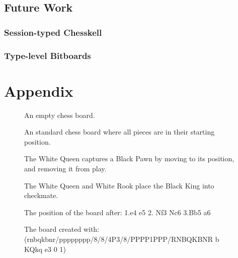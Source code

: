 \documentclass[12pt, a4paper, bibliography=totocnumbered]{scrreprt}
\begin{document}
\section{Future Work}

\subsection{Session-typed Chesskell}

\subsection{Type-level Bitboards}






\chapter{Appendix}

\begin{figure}
    \showboard
    \caption{An empty chess board.}
    \label{chessboard}
\end{figure}

\begin{figure}
    \newgame
    \showboard
    \caption{An standard chess board where all pieces are in their starting position.}
    \label{startboard}
\end{figure}

\begin{figure}
    \showboard
    \quad
    \showboard
    \caption{The White Queen captures a Black Pawn by moving to its position, and removing it from play.}
    \label{capture}
\end{figure}

\begin{figure}
    \showboard
    \caption{The White Queen and White Rook place the Black King into checkmate.}
    \label{checkmate}
\end{figure}

\begin{figure}
    \newgame
    \showboard
    \caption{The position of the board after: 1.e4 e5 2. Nf3 Nc6 3.Bb5 a6}
    \label{algebraicexample}
\end{figure}

\begin{figure}
    \showboard
    \caption{The board created with: (rnbqkbnr/pppppppp/8/8/4P3/8/PPPP1PPP/RNBQKBNR b KQkq e3 0 1)}
    \label{fenexample}
\end{figure}
\end{document}

